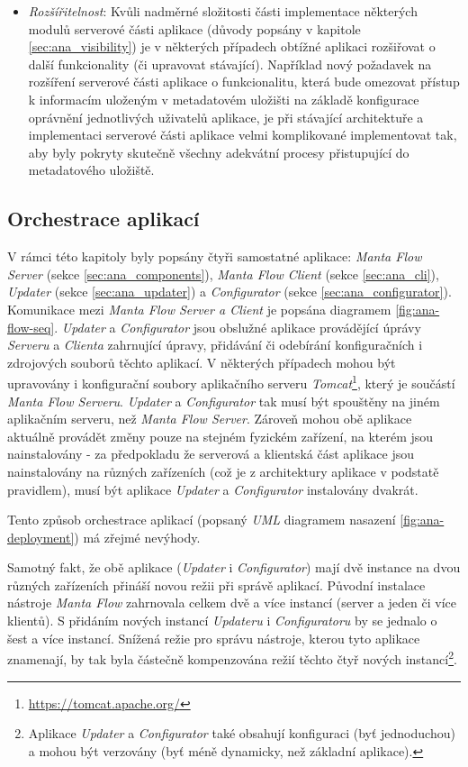 \begin{itemize}
	\item{\textit{Rozšířitelnost}}: Kvůli nadměrné složitosti části implementace některých modulů serverové části aplikace (důvody popsány v kapitole \ref{sec:ana_visibility}) je v některých případech obtížné aplikaci rozšiřovat o další funkcionality (či upravovat stávající). Například nový požadavek na rozšíření serverové části aplikace o funkcionalitu, která bude omezovat přístup k informacím uloženým v metadatovém uložišti na základě konfigurace oprávnění jednotlivých uživatelů aplikace, je při stávající architektuře a implementaci serverové části aplikace velmi komplikované implementovat tak, aby byly pokryty skutečně všechny adekvátní procesy přistupující do metadatového uložiště.
\end{itemize}


\subsection{Orchestrace aplikací}
\label{sec:ana_orchestrace}
V rámci této kapitoly byly popsány čtyři samostatné aplikace: \textit{Manta Flow Server} (sekce \ref{sec:ana_components}), \textit{Manta Flow Client} (sekce \ref{sec:ana_cli}), \textit{Updater} (sekce \ref{sec:ana_updater}) a
\textit{Configurator} (sekce \ref{sec:ana_configurator}).
Komunikace mezi \textit{Manta Flow Server a Client} je popsána diagramem \ref{fig:ana-flow-seq}. \textit{Updater} a \textit{Configurator} jsou obslužné aplikace provádějící úprávy \textit{Serveru} a \textit{Clienta} zahrnující úpravy, přidávání či odebírání konfiguračních i zdrojových souborů těchto aplikací. V některých případech mohou být upravovány i konfigurační soubory aplikačního serveru \textit{Tomcat}\footnote{\url{https://tomcat.apache.org/}}, který je součástí \textit{Manta Flow Serveru}. \textit{Updater} a \textit{Configurator} tak musí být spouštěny na jiném aplikačním serveru, než \textit{Manta Flow Server}.
Zároveň mohou obě aplikace aktuálně provádět změny pouze na stejném fyzickém zařízení, na kterém jsou nainstalovány - za předpokladu že serverová a klientská část aplikace jsou nainstalovány na různých zařízeních (což je z architektury aplikace v podstatě pravidlem), musí být aplikace \textit{Updater} a \textit{Configurator} instalovány dvakrát.

Tento způsob orchestrace aplikací (popsaný \textit{UML} diagramem nasazení \ref{fig:ana-deployment}) má zřejmé nevýhody.

Samotný fakt, že obě aplikace (\textit{Updater} i \textit{Configurator}) mají dvě instance na dvou různých zařízeních přináší novou režii při správě aplikací. Původní instalace nástroje \textit{Manta Flow} zahrnovala celkem dvě a více instancí (server a jeden či více klientů). S přidáním nových instancí \textit{Updateru} i \textit{Configuratoru} by se jednalo o šest a více instancí. Snížená režie pro správu nástroje, kterou tyto aplikace znamenají, by tak byla částečně kompenzována režií těchto čtyř nových instancí\footnote{Aplikace \textit{Updater} a \textit{Configurator} také obsahují konfiguraci (byť jednoduchou) a mohou být verzovány (byť méně dynamicky, než základní aplikace).}.

